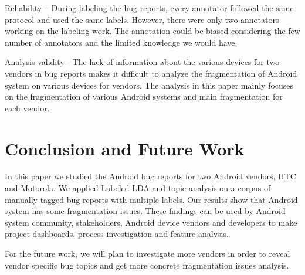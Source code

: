 \documentclass[10pt, conference, compsocconf]{IEEEtran}
\begin{document}
Reliability – During labeling the bug reports, every annotator followed the same protocol and used the same labels. However, there were only two annotators working on the labeling work. The annotation could be biased considering the few number of annotators and the limited knowledge we would have.	

Analysis validity - The lack of information about the various devices for two vendors in bug reports makes it difficult to analyze the fragmentation of Android system on various devices for vendors. The analysis in this paper mainly focuses on the fragmentation of various Android systems and main fragmentation for each vendor.


\section{Conclusion and Future Work}

In this paper we studied the Android bug reports for two Android vendors, HTC and Motorola. We applied Labeled LDA and topic analysis on a corpus of manually tagged bug reports with multiple labels. Our results show that Android system has some fragmentation issues. These findings can be used by Android system community, stakeholders, Android device vendors and developers to make project dashboards, process investigation and feature analysis.

For the future work, we will plan to investigate more vendors in order to reveal vendor specific bug topics and get more concrete fragmentation issues analysis.


\end{document}

